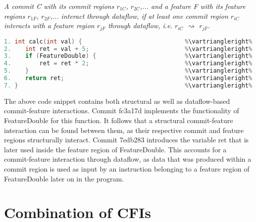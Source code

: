 \begin{definition}\label{def:dataflow_cfi}
\emph{A commit C with its commit regions $r_{1C}$, $r_{2C}$,... and a feature F with its feature regions $r_{1F}$, $r_{2F}$,... interact through dataflow, if at least one commit region $r_{iC}$ interacts with a feature region $r_{jF}$ through dataflow, i.e. $r_{iC}$ $\rightsquigarrow$ $r_{jF}$.}
\end{definition}

\begin{lstlisting}[language=C++, caption={Illustration of Structural and Dataflow-based CFIs}, label=DescriptiveLabel]	
1. int calc(int val) {                             %\vartriangleright% %\texttt{d93df4a}%
2.    int ret = val + 5;                           %\vartriangleright% %\texttt{7edb283}%
3.    if (FeatureDouble) {                         %\vartriangleright% %\texttt{fc3a17d}%    %\vartriangleright% %FeatureDouble%
4.        ret = ret * 2;                           %\vartriangleright% %\texttt{fc3a17d}%    %\vartriangleright% %FeatureDouble%
5.    }                                            %\vartriangleright% %\texttt{fc3a17d}%    %\vartriangleright% %FeatureDouble%
6.    return ret;                                  %\vartriangleright% %\texttt{d93df4a}%   
7. }                                               %\vartriangleright% %\texttt{d93df4a}%   
\end{lstlisting}
The above code snippet contains both structural as well as dataflow-based commit-feature interactions.
Commit \textsf{fc3a17d} implements the functionality of \textsf{FeatureDouble} for this function.
It follows that a structural commit-feature interaction can be found between them, as their respective commit and feature regions structurally interact.
Commit \textsf{7edb283} introduces the variable \textsf{ret} that is later used inside the feature region of \textsf{FeatureDouble}. 
This accounts for a commit-feature interaction through dataflow, as data that was produced within a commit region is used as input 
by an instruction belonging to a feature region of \textsf{FeatureDouble} later on in the program.

\section{Combination of CFIs}\label{sec:combination_cfis}

